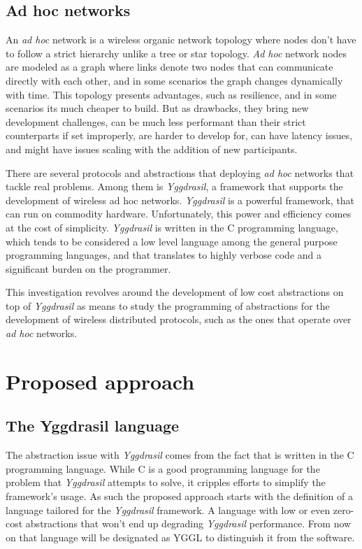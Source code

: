 \documentclass[runningheads]{llncs}
\begin{document}
\subsection{Ad hoc networks}
An \textit{ad hoc} network is a wireless organic network topology where nodes don't have to follow a strict hierarchy unlike a tree or star topology.
\textit{Ad hoc} network nodes are modeled as a graph where links denote two nodes that can communicate directly with each other, and in some scenarios the graph changes dynamically with time.\cite{Akos:2018}
This topology presents advantages, such as resilience, and in some scenarios its much cheaper to build. But as drawbacks, they bring new development challenges, can be much less performant than their strict counterparts if set improperly, are harder to develop for, can have latency issues, and might have issues scaling with the addition of new participants.
\par There are several protocols and abstractions that deploying \textit{ad hoc} networks that tackle real problems. Among them is \textit{Yggdrasil}, a framework that supports the development of wireless ad hoc networks.
\textit{Yggdrasil} is a powerful framework, that can run on commodity hardware. Unfortunately, this power and efficiency comes at the cost of simplicity.
\textit{Yggdrasil} is written in the C programming language, which tends to be considered a low level language among the general purpose programming languages, and that translates to highly verbose code and a significant burden on the programmer.
\par This investigation revolves around the development of low cost abstractions on top of \textit{Yggdrasil} as means to study the programming of abstractions for the development of wireless distributed protocols, such as the ones that operate over \textit{ad hoc} networks.

\section{Proposed approach}
\subsection{The Yggdrasil language}
The abstraction issue with \textit{Yggdrasil} comes from the fact that is written in the C programming language. While C is a good programming language for the problem that \textit{Yggdrasil} attempts to solve, it cripples efforts to simplify the framework's usage. As such the proposed approach starts with the definition of a language tailored for the \textit{Yggdrasil} framework. A language with low or even zero-cost abstractions that won't end up degrading \textit{Yggdrasil} performance. From now on that language will be designated as YGGL to distinguish it from the software.
\end{document}
